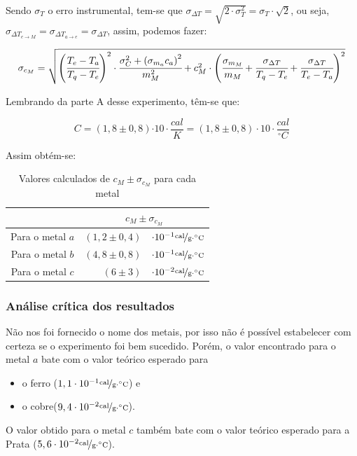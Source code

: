 \documentclass[a4paper]{article}
\providecommand{\tabularnewline}{\\}
\begin{document}
                Sendo $\sigma_{T}$ o erro instrumental, tem-se que 
                $\sigma_{\Delta T} = \sqrt{2\cdot \sigma_{T}^{2}}=\sigma_{T}\cdot \sqrt{2} $, 
                ou seja, $\sigma_{\Delta T_{e\rightarrow M}}= \sigma_{\Delta T_{a\rightarrow e}} = \sigma_{\Delta T}$, 
                assim, podemos fazer:

				\begin{equation}
					\sigma_{c_{M}} = 
					  \sqrt{
						\left(\cfrac{T_{e}-T_{a}}{T_{q}-T_{e}}\right)^{2}\cdot
						\cfrac{\sigma_{C}^{2}+\left(\sigma_{m_{a}}c_{a}\right)^{2}}{m_{M}^{2}}+
						c_{M}^{2}\cdot\left(
						\cfrac{\sigma_{m_{M}}}{m_{M}}+
						\cfrac{\sigma_{\Delta T}}{T_{q}-T_{e}}+
						\cfrac{\sigma_{\Delta T}}{T_{e}-T_{a}}\right)^{2}
					  }
				\end{equation}


				Lembrando da parte A desse experimento, têm-se que:

				\begin{equation}
					C=\left(1,8\pm0,8\right)\unit{\cdot10\cdot\frac{cal}{K}=\left(1,8\pm0,8\right)\cdot10\cdot}\frac{cal}{^{\circ}C}
				\end{equation}


				Assim obtém-se:

				\begin{table}[!ht]
					\caption{Valores calculados de $c_{M}\pm\sigma_{c_{M}}$ para cada metal}


					\centering{}%
					\begin{tabular}{|c|rl|}
						\cline{2-3} 
						\multicolumn{1}{c|}{} & \multicolumn{2}{c|}{$c_{M}\pm\sigma_{c_{M}}$}\tabularnewline
						\hline 
						Para o metal $a$  & $\left(1,2\pm0,4\right)$  & 
						$\cdot10^{-1}\unitfrac{cal}{g\cdot^{\circ}C}$\tabularnewline
						\hline 
						Para o metal $b$  & $\left(4,8\pm0,8\right)$  & 
						$\cdot10^{-1}\unitfrac{cal}{g\cdot^{\circ}C}$\tabularnewline
						\hline 
						Para o metal $c$  & $\left(6\pm3\right)$  & 
						$\cdot10^{-2}\unitfrac{cal}{g\cdot^{\circ}C}$\tabularnewline
						\hline 
					\end{tabular}
				\end{table}

			\subsubsection{Análise crítica dos resultados}

				Não nos foi fornecido o nome dos metais, por isso não é possível estabelecer
				com certeza se o experimento foi bem sucedido. Porém, o valor encontrado
				para o metal $a$ bate com o valor teórico esperado para 
				\begin{itemize}
					\item o ferro ($1,1\cdot10^{-1}\unitfrac{cal}{g\cdot^{\circ}C}$) e 
					\item o cobre($9,4\cdot10^{-2}\unitfrac{cal}{g\cdot^{\circ}C}$). 
				\end{itemize}
				O valor obtido para o metal $c$ também bate com o valor teórico esperado
				para a Prata ($5,6\cdot10^{-2}\unitfrac{cal}{g\cdot^{\circ}C}$).
\end{document}

